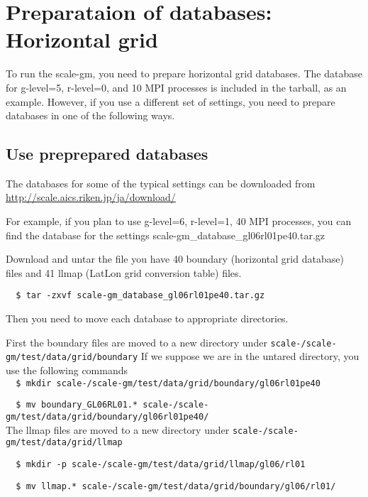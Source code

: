 \section{Preparataion of databases: Horizontal grid}

To run the scale-gm, you need to prepare horizontal grid databases. 
The database for g-level=5, r-level=0, and 10 MPI processes 
is included in the tarball, as an example.
However, if you use a different set of settings, you need to prepare databases 
in one of the following ways.
\subsection{Use preprepared databases}
The databases for some of the typical settings can be downloaded from 
\noindent \url{http://scale.aics.riken.jp/ja/download/}

For example, if you plan to use g-level=6, r-level=1, 40 MPI processes, 
you can find the database for the settings 
scale-gm\_database\_gl06rl01pe40.tar.gz

Download and untar the file you have 40 boundary (horizontal grid database)
files and 41 llmap (LatLon
grid conversion table) files. 
\begin{verbatim}
  $ tar -zxvf scale-gm_database_gl06rl01pe40.tar.gz
\end{verbatim}

\noindent Then you need to move each database to appropriate directories.

\noindent First the boundary files are moved to a new directory under 
\texttt{scale-{\version}/scale-gm/test/data/grid/boundary}
If we suppose we are in the untared directory, you use the following commands
\\

\verb|  $ mkdir scale-|{\version}\verb|/scale-gm/test/data/grid/boundary/gl06rl01pe40|

\verb|  $ mv boundary_GL06RL01.* scale-|{\version}\verb|/scale-gm/test/data/grid/boundary/gl06rl01pe40/|
\\

\noindent The llmap files are moved to a new directory under 
\texttt{scale-{\version}/scale-gm/test/data/grid/llmap}

\verb|  $ mkdir -p scale-|{\version}\verb|/scale-gm/test/data/grid/llmap/gl06/rl01|

\verb|  $ mv llmap.* scale-|{\version}\verb|/scale-gm/test/data/grid/boundary/gl06/rl01/| \\


